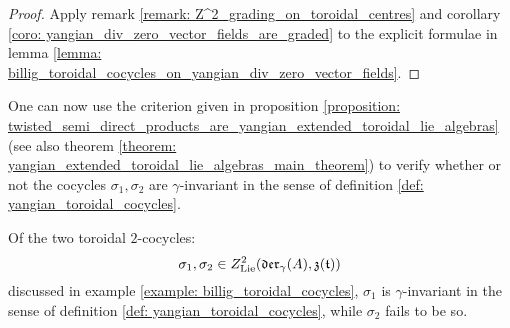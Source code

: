             \begin{proof}
                Apply remark \ref{remark: Z^2_grading_on_toroidal_centres} and corollary \ref{coro: yangian_div_zero_vector_fields_are_graded} to the explicit formulae in lemma \ref{lemma: billig_toroidal_cocycles_on_yangian_div_zero_vector_fields}.
            \end{proof}

        One can now use the criterion given in proposition \ref{proposition: twisted_semi_direct_products_are_yangian_extended_toroidal_lie_algebras} (see also theorem \ref{theorem: yangian_extended_toroidal_lie_algebras_main_theorem}) to verify whether or not the cocycles $\sigma_1, \sigma_2$ are $\gamma$-invariant in the sense of definition \ref{def: yangian_toroidal_cocycles}.
        \begin{proposition} \label{prop: invariance_of_billig_toroidal_cocycles}
            Of the two toroidal $2$-cocycles:
                $$\sigma_1, \sigma_2 \in Z^2_{\mathrm{Lie}}(\mathfrak{der}_{\gamma}(A), \mathfrak{z}(\mathfrak{t}))$$
            discussed in example \ref{example: billig_toroidal_cocycles}, $\sigma_1$ is $\gamma$-invariant in the sense of definition \ref{def: yangian_toroidal_cocycles}, while $\sigma_2$ fails to be so.
        \end{proposition}
